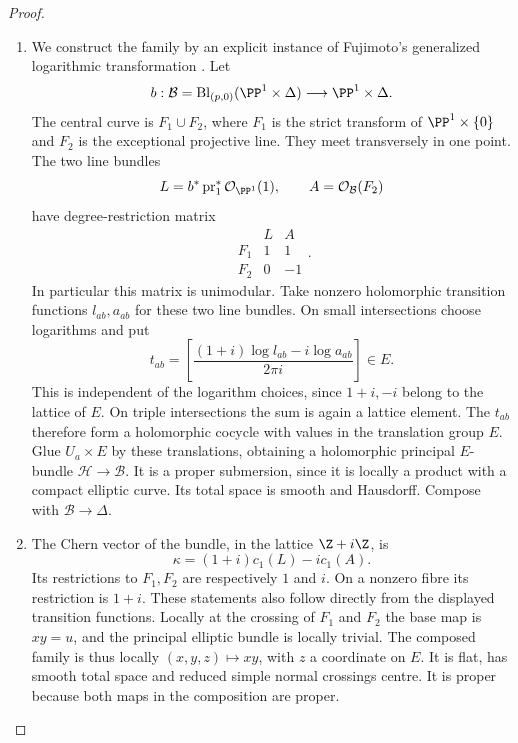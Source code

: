 \begin{proof}
\begin{enumerate}[label=\arabic*.,leftmargin=*]
\item We construct the family by an explicit instance of Fujimoto's
generalized logarithmic transformation
\citep[Definition 1.1, pp.~85--86]{Fujimoto1990AB}.
Let
\[
 b:\mathcal B=\operatorname{Bl}_{(p,0)}(\PP^1\times\Delta)
       \longrightarrow\PP^1\times\Delta.
\]
The central curve is $F_1\cup F_2$, where $F_1$ is the strict
transform of $\PP^1\times\{0\}$ and $F_2$ is the exceptional
projective line.  They meet transversely in one point.  The two
line bundles
\[
 L=b^*\operatorname{pr}_1^*\mathcal O_{\PP^1}(1),
 \qquad A=\mathcal O_{\mathcal B}(F_2)
\]
have degree-restriction matrix
\[
 \begin{array}{c|rr}
       &L&A\\\hline
 F_1&1&1\\
 F_2&0&-1
 \end{array}.
\]
In particular this matrix is unimodular.  Take nonzero holomorphic
transition functions $l_{ab},a_{ab}$ for these two line bundles.
On small intersections choose logarithms and put
\[
 t_{ab}=\left[
       \frac{(1+i)\log l_{ab}-i\log a_{ab}}{2\pi i}
                         \right]\in E.
\]
This is independent of the logarithm choices, since $1+i,-i$
belong to the lattice of $E$.  On triple intersections the sum
is again a lattice element.  The $t_{ab}$ therefore form a
holomorphic cocycle with values in the translation group $E$.
Glue $U_a\times E$ by these translations, obtaining a
holomorphic principal $E$-bundle $\mathcal H\to\mathcal B$.
It is a proper submersion, since it is locally a product with a
compact elliptic curve.  Its total space is smooth and Hausdorff.
Compose with $\mathcal B\to\Delta$.

\item The Chern vector of the bundle, in the lattice $\Z+i\Z$, is
\[
 \kappa=(1+i)c_1(L)-i c_1(A).
\]
Its restrictions to $F_1,F_2$ are respectively $1$ and $i$.
On a nonzero fibre its restriction is $1+i$.  These statements
also follow directly from the displayed transition functions.
Locally at the crossing of $F_1$ and $F_2$ the base map is
$xy=u$, and the principal elliptic bundle is locally trivial.
The composed family is thus locally $(x,y,z)\mapsto xy$,
with $z$ a coordinate on $E$.  It is flat, has smooth total
space and reduced simple normal crossings centre.  It is proper
because both maps in the composition are proper.


\end{enumerate}
\end{proof}
